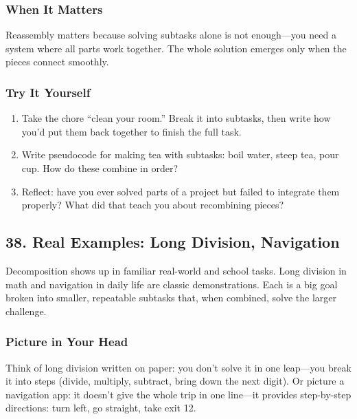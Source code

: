 \documentclass[
  letterpaper,
  DIV=11,
  numbers=noendperiod]{scrreprt}
\providecommand{\tightlist}{%
  \setlength{\itemsep}{0pt}\setlength{\parskip}{0pt}}
\begin{document}
\subsubsection{When It Matters}\label{when-it-matters-34}

Reassembly matters because solving subtasks alone is not enough---you
need a system where all parts work together. The whole solution emerges
only when the pieces connect smoothly.

\subsubsection{Try It Yourself}\label{try-it-yourself-36}

\begin{enumerate}
\def\labelenumi{\arabic{enumi}.}
\tightlist
\item
  Take the chore ``clean your room.'' Break it into subtasks, then write
  how you'd put them back together to finish the full task.
\item
  Write pseudocode for making tea with subtasks: boil water, steep tea,
  pour cup. How do these combine in order?
\item
  Reflect: have you ever solved parts of a project but failed to
  integrate them properly? What did that teach you about recombining
  pieces?
\end{enumerate}

\subsection{38. Real Examples: Long Division,
Navigation}\label{real-examples-long-division-navigation}

Decomposition shows up in familiar real-world and school tasks. Long
division in math and navigation in daily life are classic
demonstrations. Each is a big goal broken into smaller, repeatable
subtasks that, when combined, solve the larger challenge.

\subsubsection{Picture in Your Head}\label{picture-in-your-head-37}

Think of long division written on paper: you don't solve it in one
leap---you break it into steps (divide, multiply, subtract, bring down
the next digit). Or picture a navigation app: it doesn't give the whole
trip in one line---it provides step-by-step directions: turn left, go
straight, take exit 12.
\end{document}
